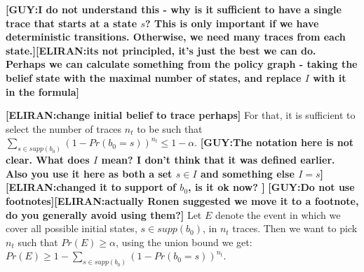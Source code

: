 \documentclass[letterpaper]{article} %
\newcommand{\eliran}[1]{\textbf{[\color{red}ELIRAN:#1]}}
\newcommand{\guy}[1]{\textbf{[\color{orange}GUY:#1]}}
\begin{document}
\guy{I do not understand this - why is it sufficient to have a single trace that starts at a state $s$? This is only important if we have deterministic transitions. Otherwise, we need many traces from each state.}\eliran{its not principled, it's just the best we can do. Perhaps we can calculate something from the policy graph - taking the belief state with the maximal number of states, and replace $I$ with it in the formula}

\eliran{change initial belief to trace perhaps}
For that, it is sufficient to select the number of traces $n_t$ to be such that $\sum_{s\in supp(b_0)}(1-Pr(b_0=s))^{n_t} \leq 1-\alpha$. \guy{The notation here is not clear. What does $I$ mean? I don't think that it was defined earlier. Also you use it here as both a set $s \in I$ and something else $I=s$}\eliran{changed it to support of $b_0$, is it ok now? } \guy{Do not use footnotes}\eliran{actually Ronen suggested we move it to a footnote, do you generally avoid using them?}
Let $E$ denote the event in which we cover all possible initial states, $s \in supp(b_0)$, in $n_t$ traces. Then we want to pick $n_t$ such that $Pr(E)\geq \alpha$, using the union bound we get: $Pr(E)\geq 1-\sum_{s\in supp(b_0)}(1-Pr(b_0=s))^{n_t}$.
\end{document}
